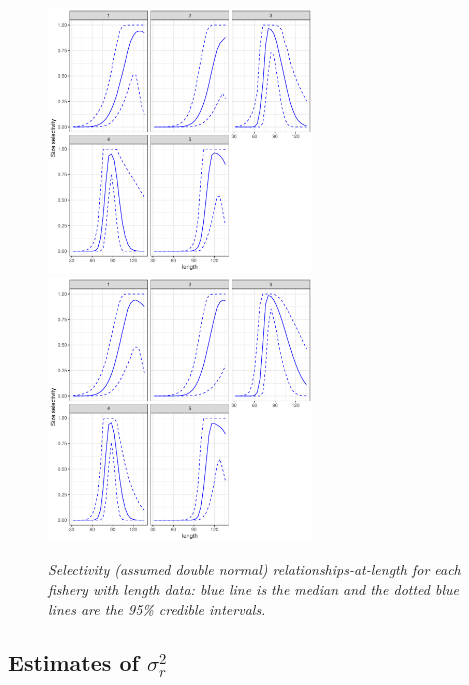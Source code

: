 \documentclass[12pt,a4paper,twoside,times,sky,standard]{csiroreport2017}
\newcommand{\sigr}{\sigma^2_r}
\begin{document}
\begin{figure}[hb]
    \begin{center}
       \includegraphics[width=7cm,height=7cm]{figs/case4_lengthsel.pdf}\includegraphics[width=7cm,height=7cm]{figs/case4a_lengthsel.pdf} 
    \end{center}
    \caption{\textit{Selectivity (assumed double normal) relationships-at-length for each fishery with
length data: blue line is the median and the dotted blue lines are the 95\% credible intervals.}}
\end{figure}

\subsection{Estimates of $\sigr$}
\end{document}
